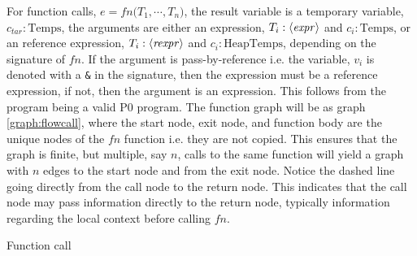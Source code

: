 For function calls, $e = \mathit{fn}\texttt{(}T_1,\cdots, T_n\texttt{)}$, the result variable is a temporary variable, $c_{tar}:\text{Temps}$, the arguments are either an expression, $T_i : \langle\mathit{expr}\rangle$ and $c_i : \text{Temps}$, or an reference expression, $T_i : \langle\mathit{rexpr}\rangle$ and $c_i : \text{HeapTemps}$, depending on the signature of $\mathit{fn}$. If the argument is pass-by-reference i.e. the variable, $v_i$ is denoted with a \texttt{\&} in the signature, then the expression must be a reference expression, if not, then the argument is an expression. This follows from the program being a valid P0 program. The function graph will be as graph \ref{graph:flowcall}, where the start node, exit node, and function body are the unique nodes of the $\mathit{fn}$ function i.e. they are not copied. This ensures that the graph is finite, but multiple, say $n$, calls to the same function will yield a graph with $n$ edges to the start node and from the exit node. Notice the dashed line going directly from the call node to the return node. This indicates that the call node may pass information directly to the return node, typically information regarding the local context before calling $\mathit{fn}$.

\begin{graph}
\centering
\captionsetup{justification=centering}
\begin{adjustbox}{max size={.3\textwidth}{.40\textheight}}\end{adjustbox}
\caption{Function call \label{graph:flowcall}}
\end{graph}

